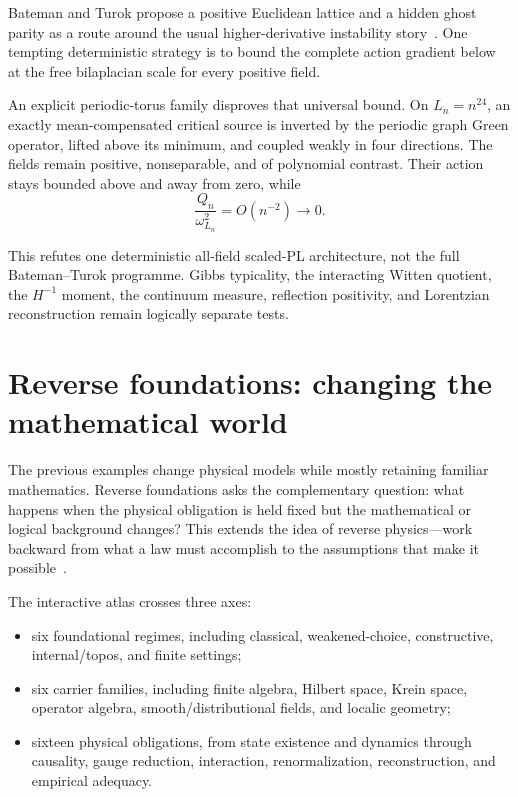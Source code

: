 \documentclass[11pt]{article}
\begin{document}
Bateman and Turok propose a positive Euclidean lattice and a hidden ghost
parity as a route around the usual higher-derivative instability
story~\cite{BatemanTurok2026}.  One tempting deterministic strategy is to
bound the complete action gradient below at the free bilaplacian scale for
every positive field.

An explicit periodic-torus family disproves that universal bound.  On
\(L_n=n^{24}\), an exactly mean-compensated critical source is inverted by the
periodic graph Green operator, lifted above its minimum, and coupled weakly in
four directions.  The fields remain positive, nonseparable, and of
polynomial contrast.  Their action stays bounded above and away from zero,
while
\[
 \frac{Q_n}{\omega_{L_n}^2}=O(n^{-2})\longrightarrow0.
\]

This refutes one deterministic all-field scaled-PL architecture, not the full
Bateman--Turok programme.  Gibbs typicality, the interacting Witten quotient,
the \(H^{-1}\) moment, the continuum measure, reflection positivity, and
Lorentzian reconstruction remain logically separate tests.

\section{Reverse foundations: changing the mathematical world}

The previous examples change physical models while mostly retaining familiar
mathematics.  Reverse foundations asks the complementary question: what
happens when the physical obligation is held fixed but the mathematical or
logical background changes?  This extends the idea of reverse physics---work
backward from what a law must accomplish to the assumptions that make it
possible~\cite{CarcassiAidala2022}.

The interactive atlas crosses three axes:
\begin{itemize}
\item six foundational regimes, including classical, weakened-choice,
constructive, internal/topos, and finite settings;
\item six carrier families, including finite algebra, Hilbert space, Krein
space, operator algebra, smooth/distributional fields, and localic geometry;
\item sixteen physical obligations, from state existence and dynamics through
causality, gauge reduction, interaction, renormalization, reconstruction, and
empirical adequacy.
\end{itemize}
\end{document}
